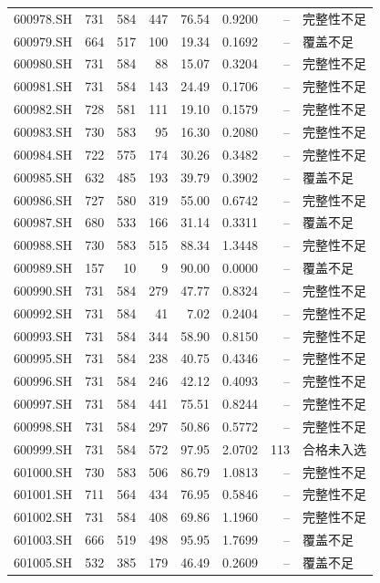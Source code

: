 \documentclass[10pt,a4paper]{article}
\begin{document}
\begin{longtable}{lrrr r r r l}
600978.SH & 731 & 584 & 447 & 76.54 & 0.9200 & -- & 完整性不足\\
600979.SH & 664 & 517 & 100 & 19.34 & 0.1692 & -- & 覆盖不足\\
600980.SH & 731 & 584 & 88 & 15.07 & 0.3204 & -- & 完整性不足\\
600981.SH & 731 & 584 & 143 & 24.49 & 0.1706 & -- & 完整性不足\\
600982.SH & 728 & 581 & 111 & 19.10 & 0.1579 & -- & 完整性不足\\
600983.SH & 730 & 583 & 95 & 16.30 & 0.2080 & -- & 完整性不足\\
600984.SH & 722 & 575 & 174 & 30.26 & 0.3482 & -- & 完整性不足\\
600985.SH & 632 & 485 & 193 & 39.79 & 0.3902 & -- & 覆盖不足\\
600986.SH & 727 & 580 & 319 & 55.00 & 0.6742 & -- & 完整性不足\\
600987.SH & 680 & 533 & 166 & 31.14 & 0.3311 & -- & 覆盖不足\\
600988.SH & 730 & 583 & 515 & 88.34 & 1.3448 & -- & 完整性不足\\
600989.SH & 157 & 10 & 9 & 90.00 & 0.0000 & -- & 覆盖不足\\
600990.SH & 731 & 584 & 279 & 47.77 & 0.8324 & -- & 完整性不足\\
600992.SH & 731 & 584 & 41 & 7.02 & 0.2404 & -- & 完整性不足\\
600993.SH & 731 & 584 & 344 & 58.90 & 0.8150 & -- & 完整性不足\\
600995.SH & 731 & 584 & 238 & 40.75 & 0.4346 & -- & 完整性不足\\
600996.SH & 731 & 584 & 246 & 42.12 & 0.4093 & -- & 完整性不足\\
600997.SH & 731 & 584 & 441 & 75.51 & 0.8244 & -- & 完整性不足\\
600998.SH & 731 & 584 & 297 & 50.86 & 0.5772 & -- & 完整性不足\\
600999.SH & 731 & 584 & 572 & 97.95 & 2.0702 & 113 & 合格未入选\\
601000.SH & 730 & 583 & 506 & 86.79 & 1.0813 & -- & 完整性不足\\
601001.SH & 711 & 564 & 434 & 76.95 & 0.5846 & -- & 完整性不足\\
601002.SH & 731 & 584 & 408 & 69.86 & 1.1960 & -- & 完整性不足\\
601003.SH & 666 & 519 & 498 & 95.95 & 1.7699 & -- & 覆盖不足\\
601005.SH & 532 & 385 & 179 & 46.49 & 0.2609 & -- & 覆盖不足\\

\end{longtable}
\end{document}
